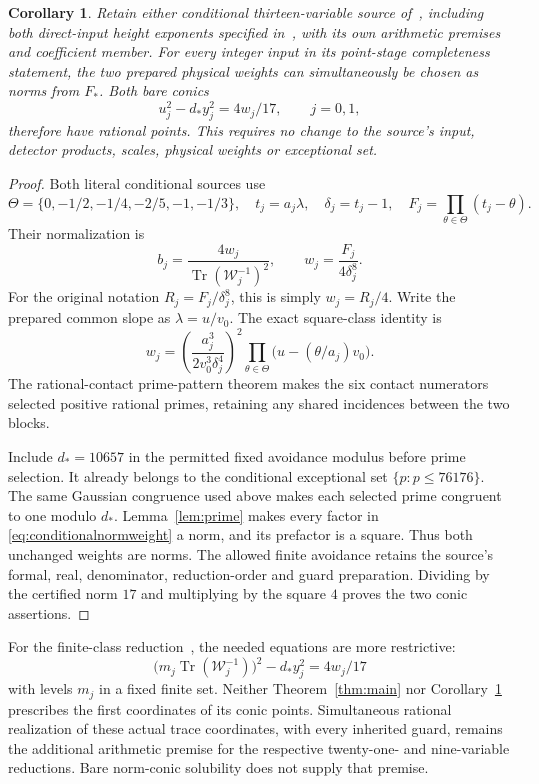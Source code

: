 \documentclass[11pt,a4paper]{article}
\newtheorem{corollary}[theorem]{Corollary}
\DeclareMathOperator{\Tr}{Tr}\DeclareMathOperator{\Nm}{N}
\begin{document}
\begin{corollary}\label{cor:conditionalnorms}
Retain either conditional thirteen-variable source
of~\cite{Conditional,Direct}, including both direct-input height exponents
specified in~\cite{Direct,UnitNorm}, with its own arithmetic premises and
coefficient member. For every integer input in its point-stage
completeness statement, the two prepared physical weights can
simultaneously be chosen as norms from $F_*$. Both bare conics
\[
                       u_j^2-d_*y_j^2=4w_j/17,\qquad j=0,1,
\]
therefore have rational points. This requires no change to the source's
input, detector products, scales, physical weights or exceptional set.
\end{corollary}
\begin{proof}
Both literal conditional sources use
\[
 \Theta=\{0,-1/2,-1/4,-2/5,-1,-1/3\},\quad
 t_j=a_j\lambda,\quad \delta_j=t_j-1,\quad
 F_j=\prod_{\theta\in\Theta}(t_j-\theta).
\]
Their normalization is
\[
 b_j=\frac{4w_j}{\Tr(\mathcal W_j^{-1})^2},\qquad
 w_j=\frac{F_j}{4\delta_j^8}.
\]
For the original notation $R_j=F_j/\delta_j^8$, this is simply
$w_j=R_j/4$. Write the prepared common slope as $\lambda=u/v_0$.
The exact square-class identity is
\begin{equation}\label{eq:conditionalnormweight}
 w_j=
 \left(\frac{a_j^3}{2v_0^3\delta_j^4}\right)^2
 \prod_{\theta\in\Theta}
                  \bigl(u-(\theta/a_j)v_0\bigr).
\end{equation}
The rational-contact prime-pattern theorem makes the six contact
numerators selected positive rational primes, retaining any shared
incidences between the two blocks.

Include $d_*=10657$ in the permitted fixed avoidance modulus before
prime selection. It already belongs to the conditional exceptional
set $\{p:p\le76176\}$. The same Gaussian congruence used above
makes each selected prime congruent to one modulo $d_*$.
Lemma~\ref{lem:prime} makes every factor in
\eqref{eq:conditionalnormweight} a norm, and its prefactor is a square.
Thus both unchanged weights are norms. The allowed finite avoidance
retains the source's formal, real, denominator, reduction-order and
guard preparation. Dividing by the certified norm $17$ and multiplying
by the square $4$ proves the two conic assertions.
\end{proof}

For the finite-class reduction~\cite{FiniteClasses}, the needed
equations are more restrictive:
\[
 \bigl(m_j\Tr(\mathcal W_j^{-1})\bigr)^2-d_*y_j^2=4w_j/17
\]
with levels $m_j$ in a fixed finite set. Neither
Theorem~\ref{thm:main} nor Corollary~\ref{cor:conditionalnorms}
prescribes the first coordinates of its conic points.
Simultaneous rational realization of these actual trace coordinates,
with every inherited guard, remains the additional arithmetic premise
for the respective twenty-one- and nine-variable reductions. Bare
norm-conic solubility does not supply that premise.
\end{document}
